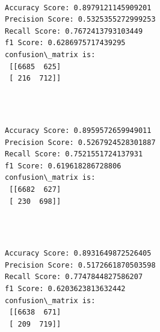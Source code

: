 \documentclass[11pt]{article}
\begin{document}
   
    \begin{center}
    \end{center}
    { \hspace*{\fill} \\}
    
    \begin{Verbatim}[commandchars=\\\{\}]
Accuracy Score: 0.8979121145909201
Precision Score: 0.5325355272999253
Recall Score: 0.7672413793103449
f1 Score: 0.6286975717439295
confusion\_matrix is: 
 [[6685  625]
 [ 216  712]] 


    \end{Verbatim}

   

    \begin{center}
    \end{center}
    { \hspace*{\fill} \\}
    
    \begin{Verbatim}[commandchars=\\\{\}]
Accuracy Score: 0.8959572659949011
Precision Score: 0.5267924528301887
Recall Score: 0.7521551724137931
f1 Score: 0.619618286728806
confusion\_matrix is: 
 [[6682  627]
 [ 230  698]] 


    \end{Verbatim}

   

    \begin{center}
    \end{center}
    { \hspace*{\fill} \\}
    
    \begin{Verbatim}[commandchars=\\\{\}]
Accuracy Score: 0.8931649872526405
Precision Score: 0.5172661870503598
Recall Score: 0.7747844827586207
f1 Score: 0.6203623813632442
confusion\_matrix is: 
 [[6638  671]
 [ 209  719]] 


    \end{Verbatim}

   

    \begin{center}
    \end{center}
    { \hspace*{\fill} \\}
    
\end{document}
